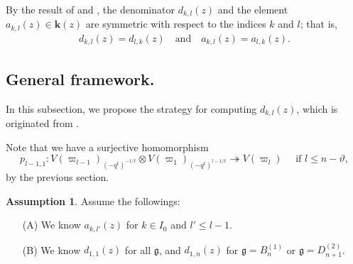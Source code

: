 \documentclass[11pt, leqno]{amsart}
\theoremstyle{definition}
\newtheorem{assumption}[theorem]{Assumption}
\numberwithin{equation}{section}
\begin{document}
By the result of \cite[Appendix A]{AK} and \cite{Chari}, the denominator $d_{k,l}(z)$ and the element $a_{k,l}(z) \in {\mathbf{k}}(z)$ are symmetric
with respect to the indices $k$ and $l$; that is,
\begin{align} \label{eq: symmetric}
 d_{k,l}(z)=d_{l,k}(z) \quad\text{and}\quad a_{k,l}(z)=a_{l,k}(z).
\end{align}

\subsection{General framework.} In this subsection, we propose the strategy for computing $d_{k,l}(z)$, which is originated from
\cite[Appendix A]{KKK13b}.

Note that we have a surjective homomorphism
\begin{equation} \label{p(k-1,1)}
 p_{l-1,1} \colon V(\varpi_{l-1})_{(-q^t)^{-1/t}} \otimes V(\varpi_1)_{(-q^t)^{l-1/t}} \twoheadrightarrow V(\varpi_l)
\quad \text{ if }  l \le n-\vartheta,
\end{equation}
by the previous section.

\begin{assumption}\label{Assum: framework} Assume the followings:
\begin{itemize}
\item[(A)] We know $a_{k,l'}(z)$ for $k \in I_0$ and $l' \le l-1$.
\item[(B)] We know $d_{1,1}(z)$ for all ${\mathfrak g}$, and $d_{1,n}(z)$ for ${\mathfrak g}=B^{(1)}_{n}$ or ${\mathfrak g}=D^{(2)}_{n+1}$.
\end{itemize}
\end{assumption}
\end{document}

